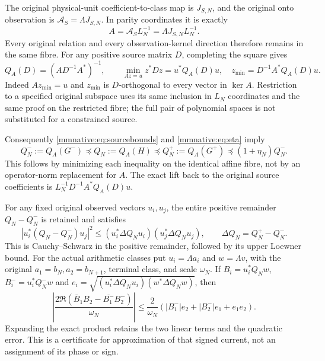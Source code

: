 \documentclass[11pt]{article}
\begin{document}
The original physical-unit coefficient-to-class map is $J_{S,N}$,
and the original onto observation is $\mathcal A_S=\Lambda J_{S,N}$.
In parity coordinates it is exactly
\begin{equation}\label{mmnative:eq:A}
 A=\mathcal A_SL_N^{-1}=\Lambda J_{S,N}L_N^{-1}.
\end{equation}
Every original relation and every observation-kernel direction
therefore remains in the same fibre.  For any positive source matrix
$D$, completing the square gives
\begin{equation}\label{mmnative:eq:minimum}
 Q_A(D)=(AD^{-1}A^*)^{-1},\qquad
 \min_{Az=u}z^*Dz=u^*Q_A(D)u,\quad
 z_{\min}=D^{-1}A^*Q_A(D)u.
\end{equation}
Indeed $Az_{\min}=u$ and $z_{\min}$ is $D$-orthogonal to every
vector in $\ker A$.  Restriction to a specified original subspace
uses its same inclusion in $L_N$ coordinates and the same proof on
the restricted fibre; the full pair of polynomial spaces is not
substituted for a constrained source.

Consequently \eqref{mmnative:eq:sourcebounds} and \eqref{mmnative:eq:eta} imply
\begin{equation}\label{mmnative:eq:Qbounds}
 \boxed{Q_N^-:=Q_A(G^-)\preceq Q_N:=Q_A(H)
 \preceq Q_N^+:=Q_A(G^+)\preceq(1+\eta_N)Q_N^-.}
\end{equation}
This follows by minimizing each inequality on the identical affine
fibre, not by an operator-norm replacement for $A$.  The exact lift
back to the original source coefficients is
$L_N^{-1}D^{-1}A^*Q_A(D)u$.

For any fixed original observed vectors $u_i,u_j$, the entire
positive remainder $Q_N-Q_N^-$ is retained and satisfies
\begin{equation}\label{mmnative:eq:crosserror}
 |u_i^*(Q_N-Q_N^-)u_j|^2
 \le (u_i^*\Delta Q_Nu_i)(u_j^*\Delta Q_Nu_j),\qquad
 \Delta Q_N=Q_N^+-Q_N^-.
\end{equation}
This is Cauchy--Schwarz in the positive remainder, followed by its
upper Loewner bound.  For the actual arithmetic classes put
$u_i=\Lambda a_i$ and $w=\Lambda v$, with the original
$a_1=b_N,a_2=b_{N+1}$, terminal class, and scale $\omega_N$.
If $B_i=u_i^*Q_Nw$, $B_i^-=u_i^*Q_N^-w$ and
$e_i=\sqrt{(u_i^*\Delta Q_Nu_i)(w^*\Delta Q_Nw)}$, then
\begin{equation}\label{mmnative:eq:signedcurrent}
 \left|\frac{2\Re(\bar B_1B_2-\overline{B_1^-}B_2^-)}{\omega_N}\right|
 \le\frac2{\omega_N}
 (|B_1^-|e_2+|B_2^-|e_1+e_1e_2).
\end{equation}
Expanding the exact product retains the two linear terms and the
quadratic error.  This is a certificate for approximation of that
signed current, not an assignment of its phase or sign.
\end{document}
